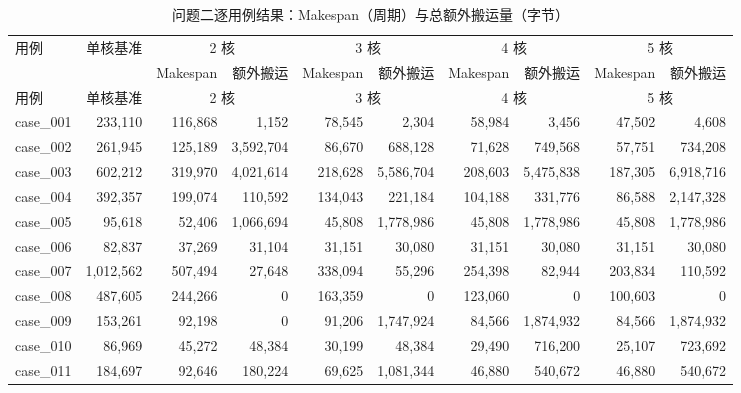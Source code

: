 \begin{footnotesize}
\setlength{\tabcolsep}{2.6pt}
\begin{longtable}{l r rr rr rr rr}
\caption{问题二逐用例结果：Makespan（周期）与总额外搬运量（字节）}\label{tab:app-p2}\\
\toprule
\multirow{2}{*}{用例} & \multirow{2}{*}{单核基准} & \multicolumn{2}{c}{2 核} & \multicolumn{2}{c}{3 核} & \multicolumn{2}{c}{4 核} & \multicolumn{2}{c}{5 核} \\
\cmidrule(lr){3-4}\cmidrule(lr){5-6}\cmidrule(lr){7-8}\cmidrule(lr){9-10}
 & & Makespan & 额外搬运 & Makespan & 额外搬运 & Makespan & 额外搬运 & Makespan & 额外搬运 \\
\midrule
\endfirsthead
\toprule
用例 & 单核基准 & \multicolumn{2}{c}{2 核} & \multicolumn{2}{c}{3 核} & \multicolumn{2}{c}{4 核} & \multicolumn{2}{c}{5 核} \\
\midrule
\endhead
\bottomrule
\endfoot
case\_001 & 233{,}110 & 116{,}868 & 1{,}152 & 78{,}545 & 2{,}304 & 58{,}984 & 3{,}456 & 47{,}502 & 4{,}608 \\
case\_002 & 261{,}945 & 125{,}189 & 3{,}592{,}704 & 86{,}670 & 688{,}128 & 71{,}628 & 749{,}568 & 57{,}751 & 734{,}208 \\
case\_003 & 602{,}212 & 319{,}970 & 4{,}021{,}614 & 218{,}628 & 5{,}586{,}704 & 208{,}603 & 5{,}475{,}838 & 187{,}305 & 6{,}918{,}716 \\
case\_004 & 392{,}357 & 199{,}074 & 110{,}592 & 134{,}043 & 221{,}184 & 104{,}188 & 331{,}776 & 86{,}588 & 2{,}147{,}328 \\
case\_005 & 95{,}618 & 52{,}406 & 1{,}066{,}694 & 45{,}808 & 1{,}778{,}986 & 45{,}808 & 1{,}778{,}986 & 45{,}808 & 1{,}778{,}986 \\
case\_006 & 82{,}837 & 37{,}269 & 31{,}104 & 31{,}151 & 30{,}080 & 31{,}151 & 30{,}080 & 31{,}151 & 30{,}080 \\
case\_007 & 1{,}012{,}562 & 507{,}494 & 27{,}648 & 338{,}094 & 55{,}296 & 254{,}398 & 82{,}944 & 203{,}834 & 110{,}592 \\
case\_008 & 487{,}605 & 244{,}266 & 0 & 163{,}359 & 0 & 123{,}060 & 0 & 100{,}603 & 0 \\
case\_009 & 153{,}261 & 92{,}198 & 0 & 91{,}206 & 1{,}747{,}924 & 84{,}566 & 1{,}874{,}932 & 84{,}566 & 1{,}874{,}932 \\
case\_010 & 86{,}969 & 45{,}272 & 48{,}384 & 30{,}199 & 48{,}384 & 29{,}490 & 716{,}200 & 25{,}107 & 723{,}692 \\
case\_011 & 184{,}697 & 92{,}646 & 180{,}224 & 69{,}625 & 1{,}081{,}344 & 46{,}880 & 540{,}672 & 46{,}880 & 540{,}672 \\

\end{longtable}
\end{footnotesize}
